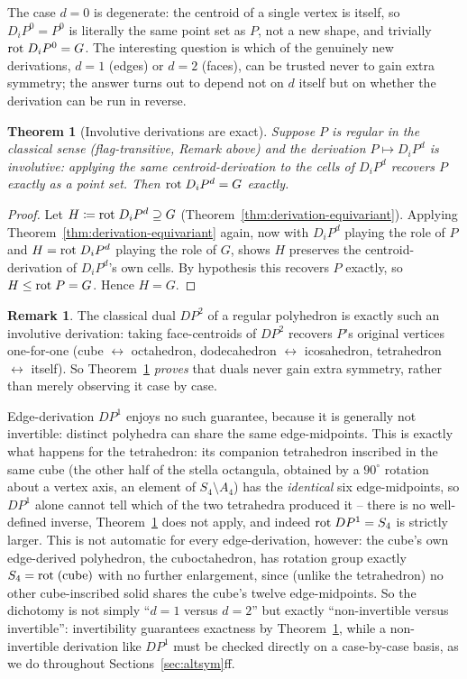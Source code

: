 \documentclass{amsart}
\theoremstyle{plain}
\newtheorem{theorem}{Theorem}
\theoremstyle{definition}
\newtheorem*{remark}{Remark}
\begin{document}
The case $d=0$ is degenerate: the centroid of a single vertex is itself, so $D_iP^0=P^0$ is literally the same point set as $P$, not a new shape, and trivially $\mathrm{rot}\hspace{1mm}D_iP^0=G$. The interesting question is which of the genuinely new derivations, $d=1$ (edges) or $d=2$ (faces), can be trusted never to gain extra symmetry; the answer turns out to depend not on $d$ itself but on whether the derivation can be run in reverse.
\begin{theorem}[Involutive derivations are exact]\label{thm:involutive-exact}
    Suppose $P$ is regular in the classical sense (flag-transitive, Remark above) and the derivation $P\mapsto D_iP^d$ is \emph{involutive}: applying the same centroid-derivation to the cells of $D_iP^d$ recovers $P$ exactly as a point set. Then $\mathrm{rot}\hspace{1mm}D_iP^d=G$ exactly.
\end{theorem}
\begin{proof}
    Let $H\coloneqq\mathrm{rot}\hspace{1mm}D_iP^d\supseteq G$ (Theorem~\ref{thm:derivation-equivariant}). Applying Theorem~\ref{thm:derivation-equivariant} again, now with $D_iP^d$ playing the role of $P$ and $H=\mathrm{rot}\hspace{1mm}D_iP^d$ playing the role of $G$, shows $H$ preserves the centroid-derivation of $D_iP^d$'s own cells. By hypothesis this recovers $P$ exactly, so $H\leq\mathrm{rot}\hspace{1mm}P=G$. Hence $H=G$.
\end{proof}
\begin{remark}
    The classical dual $DP^2$ of a regular polyhedron is exactly such an involutive derivation: taking face-centroids of $DP^2$ recovers $P$'s original vertices one-for-one (cube $\leftrightarrow$ octahedron, dodecahedron $\leftrightarrow$ icosahedron, tetrahedron $\leftrightarrow$ itself). So Theorem~\ref{thm:involutive-exact} \emph{proves} that duals never gain extra symmetry, rather than merely observing it case by case.

    Edge-derivation $DP^1$ enjoys no such guarantee, because it is generally not invertible: distinct polyhedra can share the same edge-midpoints. This is exactly what happens for the tetrahedron: its companion tetrahedron inscribed in the same cube (the other half of the stella octangula, obtained by a $90^\circ$ rotation about a vertex axis, an element of $S_4\setminus A_4$) has the \emph{identical} six edge-midpoints, so $DP^1$ alone cannot tell which of the two tetrahedra produced it -- there is no well-defined inverse, Theorem~\ref{thm:involutive-exact} does not apply, and indeed $\mathrm{rot}\hspace{1mm}DP^1=S_4$ is strictly larger. This is not automatic for every edge-derivation, however: the cube's own edge-derived polyhedron, the cuboctahedron, has rotation group exactly $S_4=\mathrm{rot}\hspace{1mm}(\text{cube})$ with no further enlargement, since (unlike the tetrahedron) no other cube-inscribed solid shares the cube's twelve edge-midpoints. So the dichotomy is not simply ``$d=1$ versus $d=2$'' but exactly ``non-invertible versus invertible'': invertibility guarantees exactness by Theorem~\ref{thm:involutive-exact}, while a non-invertible derivation like $DP^1$ must be checked directly on a case-by-case basis, as we do throughout Sections~\ref{sec:altsym}ff.
\end{remark}
 
\end{document}

